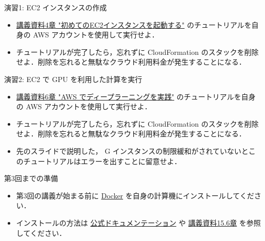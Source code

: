 \documentclass[unicode,11pt]{beamer}
\begin{document}
\begin{frame}{演習1: EC2 インスタンスの作成}

\begin{itemize}
    \item \href{https://tomomano.github.io/learn-aws-by-coding/\#sec_}{講義資料4章 "初めてのEC2インスタンスを起動する"} のチュートリアルを自身の AWS アカウントを使用して実行せよ．
    \item チュートリアルが完了したら，忘れずに CloudFormation のスタックを削除せよ．削除を忘れると無駄なクラウド利用料金が発生することになる．
\end{itemize}

\end{frame}

\begin{frame}{演習2: EC2 で GPU を利用した計算を実行}

\begin{itemize}
    \item \href{https://tomomano.github.io/learn-aws-by-coding/\#sec_jupyter_and_deep_learning}{講義資料6章 "AWS でディープラーニングを実践"} のチュートリアルを自身の AWS アカウントを使用して実行せよ．
    \item チュートリアルが完了したら，忘れずに CloudFormation のスタックを削除せよ．削除を忘れると無駄なクラウド利用料金が発生することになる．
    \item 先のスライドで説明した， G インスタンスの制限緩和がされていないとこのチュートリアルはエラーを出すことに留意せよ．
\end{itemize}

\end{frame}

\begin{frame}{第3回までの準備}

\begin{itemize}
    \item 第3回の講義が始まる前に
    \href{https://www.docker.com/}{Docker}
    を自身の計算機にインストールしてください．
    \item インストールの方法は
    \href{https://docs.docker.com/engine/install/}{公式ドキュメンテーション}
    や
    \href{https://tomomano.github.io/learn-aws-by-coding/\#sec:install_docker}{講義資料15.6章}
    を参照してください．
\end{itemize}
    
\end{frame}
\end{document}
